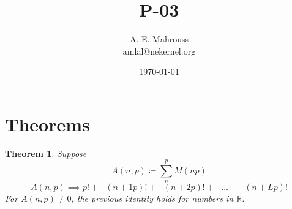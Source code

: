 \documentclass{article}
\title{P-03}
\author{A. E. Mahrouss\\amlal@nekernel.org}
\date{\today}
\theoremstyle{plain}
\newtheorem{theorem}{Theorem}[section]
\theoremstyle{definition}
\theoremstyle{remark}
\begin{document}
\maketitle

\section{Theorems}

\begin{theorem}
Suppose
\begin{equation}
    A(n, p) \coloneq \sum_{n}^{p} M(n p)
\end{equation}
\begin{equation}
    A(n, p) \implies p! + \text{ } (n+1p)! + \text{ } (n+2p)! + \text{ } \dots \text{ } + (n+Lp)! 
\end{equation}
For $A(n, p) \neq 0$, the previous identity holds for numbers in $\mathbb{R}$.
\end{theorem}
\end{document}
